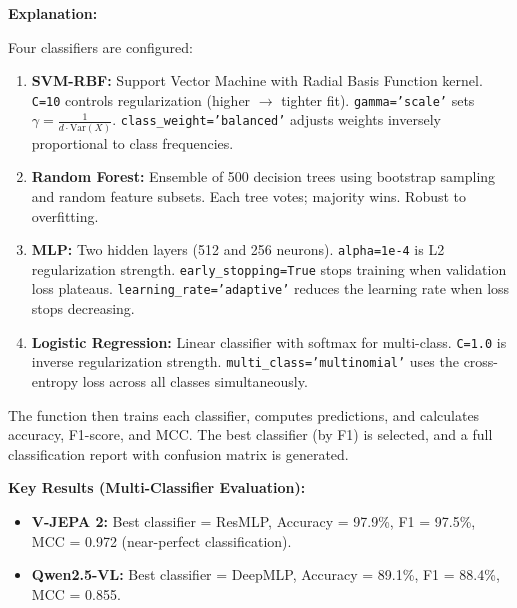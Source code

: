 \documentclass[a4paper, 12pt]{article}
\newenvironment{explanation}{%
  \par\smallskip
  \noindent\textcolor{blue!70!black}{\textbf{Explanation:}}\\
  \noindent
}{\par\medskip}
\begin{document}
\begin{explanation}
Four classifiers are configured:

\begin{enumerate}[nosep]
  \item \textbf{SVM-RBF:} Support Vector Machine with Radial Basis Function kernel. \texttt{C=10} controls regularization (higher $\to$ tighter fit). \texttt{gamma='scale'} sets $\gamma = \frac{1}{d \cdot \text{Var}(X)}$. \texttt{class\_weight='balanced'} adjusts weights inversely proportional to class frequencies.

  \item \textbf{Random Forest:} Ensemble of 500 decision trees using bootstrap sampling and random feature subsets. Each tree votes; majority wins. Robust to overfitting.

  \item \textbf{MLP:} Two hidden layers (512 and 256 neurons). \texttt{alpha=1e-4} is L2 regularization strength. \texttt{early\_stopping=True} stops training when validation loss plateaus. \texttt{learning\_rate='adaptive'} reduces the learning rate when loss stops decreasing.

  \item \textbf{Logistic Regression:} Linear classifier with softmax for multi-class. \texttt{C=1.0} is inverse regularization strength. \texttt{multi\_class='multinomial'} uses the cross-entropy loss across all classes simultaneously.
\end{enumerate}
\end{explanation}

The function then trains each classifier, computes predictions, and calculates accuracy, F1-score, and MCC. The best classifier (by F1) is selected, and a full classification report with confusion matrix is generated.

\textbf{Key Results (Multi-Classifier Evaluation):}
\begin{itemize}[nosep]
  \item \textbf{V-JEPA 2:} Best classifier = ResMLP, Accuracy = 97.9\%, F1 = 97.5\%, MCC = 0.972 (near-perfect classification).
  \item \textbf{Qwen2.5-VL:} Best classifier = DeepMLP, Accuracy = 89.1\%, F1 = 88.4\%, MCC = 0.855.
\end{itemize}

\newpage
\end{document}
